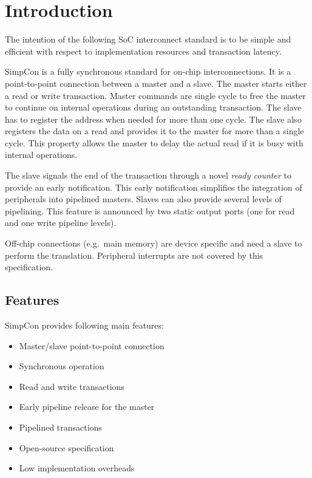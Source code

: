 
\section{Introduction}

The intention of the following SoC interconnect standard is to be
simple and efficient with respect to implementation resources and
transaction latency.

SimpCon is a fully synchronous standard for on-chip
interconnections. It is a point-to-point connection between a master
and a slave. The master starts either a read or write transaction.
Master commands are single cycle to free the master to continue on
internal operations during an outstanding transaction. The slave has
to register the address when needed for more than one cycle. The
slave also registers the data on a read and provides it to the
master for more than a single cycle. This property allows the master
to delay the actual read if it is busy with internal operations.

The slave signals the end of the transaction through a novel
\emph{ready counter} to provide an early notification. This early
notification simplifies the integration of peripherals into pipelined
masters. Slaves can also provide several levels of pipelining. This
feature is announced by two static output ports (one for read and one
write pipeline levels).

Off-chip connections (e.g.\ main memory) are device specific and
need a slave to perform the translation. Peripheral interrupts are
not covered by this specification.

\subsection{Features}

SimpCon provides following main features:

\begin{itemize}
    \item Master/slave point-to-point connection
    \item Synchronous operation
    \item Read and write transactions
    \item Early pipeline release for the master
    \item Pipelined transactions
    \item Open-source specification
    \item Low implementation overheads
\end{itemize}

